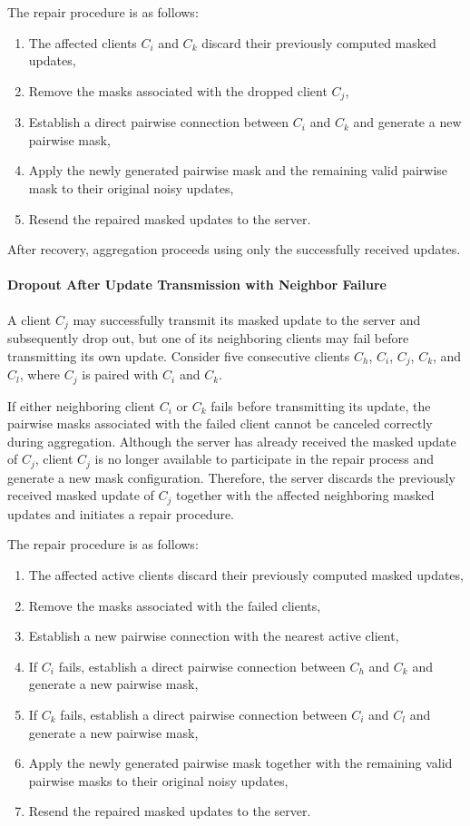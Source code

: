 \documentclass[a4paper,fleqn]{cas-dc}
\begin{document}
The repair procedure is as follows:

\begin{enumerate}
\item
  The affected clients $C_{i}$ and $C_{k}$ discard their previously computed masked updates,
\item
  Remove the masks associated with the dropped client $C_{j}$,
\item
  Establish a direct pairwise connection between $C_{i}$ and $C_{k}$ and generate a new pairwise mask,
\item
  Apply the newly generated pairwise mask and the remaining valid pairwise mask to their original noisy updates,
\item
  Resend the repaired masked updates to the server.
\end{enumerate}

After recovery, aggregation proceeds using only the successfully received updates.

\paragraph{Dropout After Update Transmission with Neighbor Failure}
A client $C_{j}$ may successfully transmit its masked update to the server and subsequently drop out, but one of its neighboring clients may fail before transmitting its own update. Consider five consecutive clients $C_{h}$, $C_{i}$, $C_{j}$, $C_{k}$, and $C_{l}$, where $C_{j}$ is paired with $C_{i}$ and $C_{k}$.

If either neighboring client $C_{i}$ or $C_{k}$ fails before transmitting its update, the pairwise masks associated with the failed client cannot be canceled correctly during aggregation. Although the server has already received the masked update of $C_{j}$, client $C_{j}$ is no longer available to participate in the repair process and generate a new mask configuration. Therefore, the server discards the previously received masked update of $C_{j}$ together with the affected neighboring masked updates and initiates a repair procedure.

The repair procedure is as follows:

\begin{enumerate}
\item
  The affected active clients discard their previously computed masked updates,
\item
  Remove the masks associated with the failed clients,
\item
  Establish a new pairwise connection with the nearest active client,
\item
  If $C_{i}$ fails, establish a direct pairwise connection between $C_{h}$ and $C_{k}$ and generate a new pairwise mask,
\item
  If $C_{k}$ fails, establish a direct pairwise connection between $C_{i}$ and $C_{l}$ and generate a new pairwise mask,
\item
  Apply the newly generated pairwise mask together with the remaining valid pairwise masks to their original noisy updates,
\item
  Resend the repaired masked updates to the server.
\end{enumerate}
\end{document}
